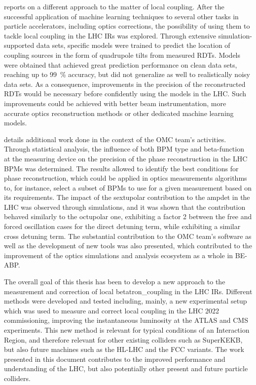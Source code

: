  reports on a different approach to the matter of local coupling.
After the successful application of machine learning techniques to several other tasks in particle accelerators, including optics corrections, the possibility of using them to tackle local coupling in the \gls{LHC} \glspl{IR} was explored.
Through extensive simulation-supported data sets, specific models were trained to predict the location of coupling sources in the form of quadrupole tilts from measured \glspl{RDT}.
Models were obtained that achieved great prediction performance on clean data sets, reaching up to \qty{99}{\percent} accuracy, but did not generalize as well to realistically noisy data sets.
As a consequence, improvements in the precision of the reconstructed \glspl{RDT} would be necessary before confidently using the models in the \gls{LHC}.
Such improvements could be achieved with better beam instrumentation, more accurate optics reconstruction methods or other dedicated machine learning models.
\break

 details additional work done in the context of the \gls{OMC} team's activities.
Through statistical analysis, the influence of both \gls{BPM} type and \gls{beta-function} at the measuring device on the precision of the phase reconstruction in the \gls{LHC} \glspl{BPM} was determined.
The results allowed to identify the best conditions for phase reconstruction, which could be applied in optics measurements algorithms to, for instance, select a subset of \glspl{BPM} to use for a given measurement based on its requirements.
The impact of the sextupolar contribution to the \gls{ampdet} in the \gls{LHC} was observed through simulations, and it was shown that the contribution behaved similarly to the octupolar one, exhibiting a factor \num{2} between the free and forced oscillation cases for the direct detuning term, while exhibiting a similar cross detuning term.
The substantial contribution to the \gls{OMC} team's software as well as the development of new tools was also presented, which contributed to the improvement of the optics simulations and analysis ecosystem as a whole in \acrshort{BE}-\acrshort{ABP}.
\break

The overall goal of this thesis has been to develop a new approach to the measurement and correction of local \gls{betatron_coupling} in the \gls{LHC} \glspl{IR}.
Different methods were developed and tested including, mainly, a new experimental setup which was used to measure and correct local coupling in the \gls{LHC} \num{2022} commissioning, improving the instantaneous luminosity at the \acrshort{ATLAS} and \acrshort{CMS} \glspl{experiment}.
This new method is relevant for typical conditions of an Interaction Region, and therefore relevant for other existing colliders such as SuperKEKB, but also future machines such as the \gls{HL-LHC} and the \gls{FCC} variants.
The work presented in this document contributes to the improved performance and understanding of the \gls{LHC}, but also potentially other present and future particle colliders.

\glsresetall                                     %
